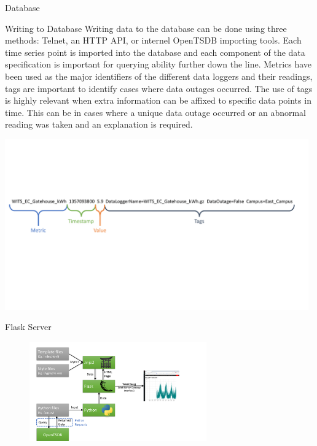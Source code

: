 \documentclass[8pt,xcolor={dvipsnames}]{beamer}
\begin{document}
{\begin{frame}{Database}
\begin{block}{Writing to Database}
Writing data to the database can be done using three methods: Telnet, an HTTP API, or internel OpenTSDB importing tools.
Each time series point is imported into the database and each component of the data specification is important for querying ability further down the line. Metrics have been used as the major identifiers of the different data loggers and their readings, tags are important to identify cases where data outages occurred. The use of tags is highly relevant when extra information can be affixed to specific data points in time. This can be in cases where a unique data outage occurred or an abnormal reading was taken and an explanation is required.
	\begin{center}
		\includegraphics[width=0.98\textwidth, trim=13 210 15 180, clip]{WritingToTheDatabaseNotBold}
	\end{center}
\end{block}

\end{frame}


\begin{frame}{Flask Server}

\begin{figure}
	\begin{center}
		\includegraphics[width=0.68\textwidth, trim=30 0 150 30, clip]{FlaskDiagram}
	\end{center}
\end{figure}


\end{frame}}
\end{document}
